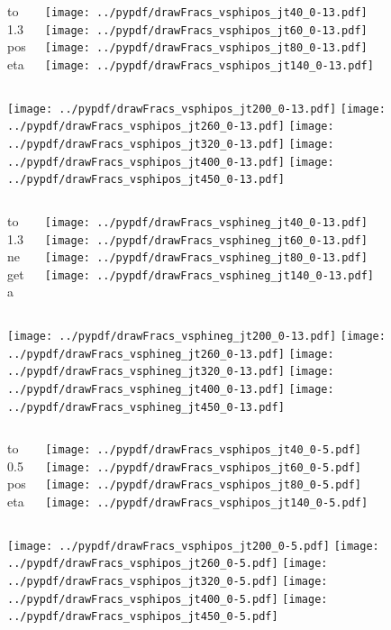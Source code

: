 \documentclass[aspectratio=169]{beamer}
\begin{document}
\begin{figure}[p]
\flushleft
\begin{columns}[T]
\begin{column}{.2\linewidth}
 to 1.3 poseta
\end{column}
\begin{column}{.8\linewidth}
\texttt{[image: ../pypdf/drawFracs\_vsphipos\_jt40\_0-13.pdf]}
\texttt{[image: ../pypdf/drawFracs\_vsphipos\_jt60\_0-13.pdf]}
\texttt{[image: ../pypdf/drawFracs\_vsphipos\_jt80\_0-13.pdf]}
\texttt{[image: ../pypdf/drawFracs\_vsphipos\_jt140\_0-13.pdf]}
\end{column}
\end{columns}
\texttt{[image: ../pypdf/drawFracs\_vsphipos\_jt200\_0-13.pdf]}
\texttt{[image: ../pypdf/drawFracs\_vsphipos\_jt260\_0-13.pdf]}
\texttt{[image: ../pypdf/drawFracs\_vsphipos\_jt320\_0-13.pdf]}
\texttt{[image: ../pypdf/drawFracs\_vsphipos\_jt400\_0-13.pdf]}
\texttt{[image: ../pypdf/drawFracs\_vsphipos\_jt450\_0-13.pdf]}
\end{figure}


\begin{figure}[p]
\flushleft
\begin{columns}[T]
\begin{column}{.2\linewidth}
 to 1.3 negeta
\end{column}
\begin{column}{.8\linewidth}
\texttt{[image: ../pypdf/drawFracs\_vsphineg\_jt40\_0-13.pdf]}
\texttt{[image: ../pypdf/drawFracs\_vsphineg\_jt60\_0-13.pdf]}
\texttt{[image: ../pypdf/drawFracs\_vsphineg\_jt80\_0-13.pdf]}
\texttt{[image: ../pypdf/drawFracs\_vsphineg\_jt140\_0-13.pdf]}
\end{column}
\end{columns}
\texttt{[image: ../pypdf/drawFracs\_vsphineg\_jt200\_0-13.pdf]}
\texttt{[image: ../pypdf/drawFracs\_vsphineg\_jt260\_0-13.pdf]}
\texttt{[image: ../pypdf/drawFracs\_vsphineg\_jt320\_0-13.pdf]}
\texttt{[image: ../pypdf/drawFracs\_vsphineg\_jt400\_0-13.pdf]}
\texttt{[image: ../pypdf/drawFracs\_vsphineg\_jt450\_0-13.pdf]}
\end{figure}

\begin{figure}[p]
\flushleft
\begin{columns}[T]
\begin{column}{.2\linewidth}
 to 0.5 poseta
\end{column}
\begin{column}{.8\linewidth}
\texttt{[image: ../pypdf/drawFracs\_vsphipos\_jt40\_0-5.pdf]}
\texttt{[image: ../pypdf/drawFracs\_vsphipos\_jt60\_0-5.pdf]}
\texttt{[image: ../pypdf/drawFracs\_vsphipos\_jt80\_0-5.pdf]}
\texttt{[image: ../pypdf/drawFracs\_vsphipos\_jt140\_0-5.pdf]}
\end{column}
\end{columns}
\texttt{[image: ../pypdf/drawFracs\_vsphipos\_jt200\_0-5.pdf]}
\texttt{[image: ../pypdf/drawFracs\_vsphipos\_jt260\_0-5.pdf]}
\texttt{[image: ../pypdf/drawFracs\_vsphipos\_jt320\_0-5.pdf]}
\texttt{[image: ../pypdf/drawFracs\_vsphipos\_jt400\_0-5.pdf]}
\texttt{[image: ../pypdf/drawFracs\_vsphipos\_jt450\_0-5.pdf]}
\end{figure}
\end{document}
